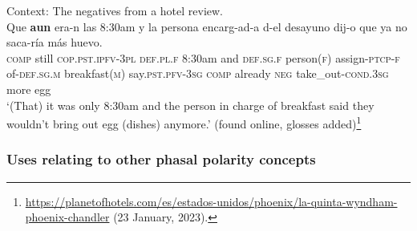 \begin{exe}
	\ex\label{exAppendixSpanishAunScalar5}
	Context: The negatives from a hotel review.\\
	\gll Que \textbf{aun} era-n las 8:30am y la persona encarg-ad-a d-el desayuno dij-o que ya no saca-ría más huevo.\\
	\textsc{comp} still \textsc{cop}.\textsc{pst}.\textsc{ipfv}-3\textsc{pl} \textsc{def}.\textsc{pl}.\textsc{f} 8:30am and \textsc{def}.\textsc{sg}.\textsc{f} person(\textsc{f}) assign-\textsc{ptcp}-\textsc{f} of-\textsc{def}.\textsc{sg}.\textsc{m} breakfast(\textsc{m}) say.\textsc{pst}.\textsc{pfv}-3\textsc{sg} \textsc{comp} already \textsc{neg} take\_out-\textsc{cond}.3\textsc{sg} more egg\\
	\glt \lq (That) it was only 8:30am and the person in charge of breakfast said they wouldn't bring out egg (dishes) anymore.\rq{ }(found online, glosses added)\footnote{\url{https://planetofhotels.com/es/estados-unidos/phoenix/la-quinta-wyndham-phoenix-chandler} (23 January, 2023).}
\end{exe}

\subsubsection{Uses relating to other phasal polarity concepts}
